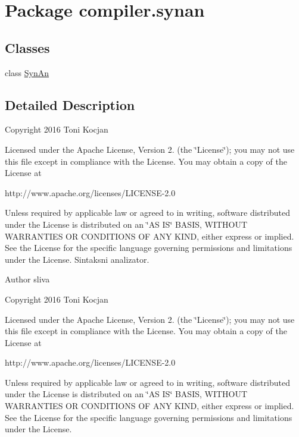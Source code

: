 \hypertarget{namespacecompiler_1_1synan}{}\section{Package compiler.\+synan}
\label{namespacecompiler_1_1synan}
\subsection*{Classes}
\begin{DoxyCompactItemize}
\item 
class \hyperlink{classcompiler_1_1synan_1_1_syn_an}{Syn\+An}
\end{DoxyCompactItemize}


\subsection{Detailed Description}
Copyright 2016 Toni Kocjan

Licensed under the Apache License, Version 2. (the \char`\"{}\+License\char`\"{}); you may not use this file except in compliance with the License. You may obtain a copy of the License at \begin{DoxyVerb}http://www.apache.org/licenses/LICENSE-2.0
\end{DoxyVerb}


Unless required by applicable law or agreed to in writing, software distributed under the License is distributed on an \char`\"{}\+A\+S I\+S\char`\"{} B\+A\+S\+IS, W\+I\+T\+H\+O\+UT W\+A\+R\+R\+A\+N\+T\+I\+ES OR C\+O\+N\+D\+I\+T\+I\+O\+NS OF A\+NY K\+I\+ND, either express or implied. See the License for the specific language governing permissions and limitations under the License. Sintaksni analizator.

\begin{DoxyAuthor}{Author}
sliva
\end{DoxyAuthor}
Copyright 2016 Toni Kocjan

Licensed under the Apache License, Version 2. (the \char`\"{}\+License\char`\"{}); you may not use this file except in compliance with the License. You may obtain a copy of the License at \begin{DoxyVerb}http://www.apache.org/licenses/LICENSE-2.0
\end{DoxyVerb}


Unless required by applicable law or agreed to in writing, software distributed under the License is distributed on an \char`\"{}\+A\+S I\+S\char`\"{} B\+A\+S\+IS, W\+I\+T\+H\+O\+UT W\+A\+R\+R\+A\+N\+T\+I\+ES OR C\+O\+N\+D\+I\+T\+I\+O\+NS OF A\+NY K\+I\+ND, either express or implied. See the License for the specific language governing permissions and limitations under the License. 